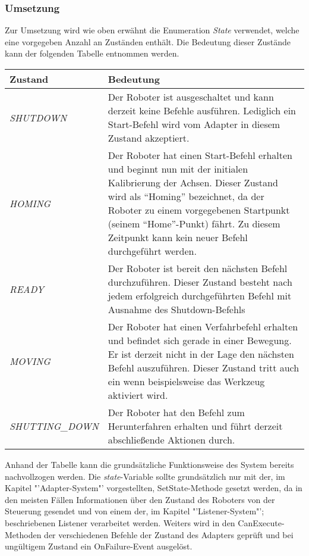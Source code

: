 \subsubsection{Umsetzung}
Zur Umsetzung wird wie oben erwähnt die Enumeration \textit{State} verwendet, welche eine vorgegeben Anzahl an Zuständen enthält. Die Bedeutung dieser Zustände kann der folgenden Tabelle entnommen werden.
\newline
\begin{tabular}{|p{4cm}|p{10cm}|}
\hline \rowcolor{lightgray}
\textbf{Zustand} & \textbf{Bedeutung}\\
\hline
\textit{SHUTDOWN} & Der Roboter ist ausgeschaltet und kann derzeit keine Befehle ausführen. Lediglich ein Start-Befehl wird vom Adapter in diesem Zustand akzeptiert.\\
\hline
\textit{HOMING} & Der Roboter hat einen Start-Befehl erhalten und beginnt nun mit der initialen Kalibrierung der Achsen. Dieser Zustand wird als “Homing” bezeichnet, da der Roboter zu einem vorgegebenen Startpunkt (seinem “Home”-Punkt) fährt. Zu diesem Zeitpunkt kann kein neuer Befehl durchgeführt werden.\\
\hline
\textit{READY} & Der Roboter ist bereit den nächsten Befehl durchzuführen. Dieser Zustand besteht nach jedem erfolgreich durchgeführten Befehl mit Ausnahme des Shutdown-Befehls \\
\hline
\textit{MOVING} & Der Roboter hat einen Verfahrbefehl erhalten und befindet sich gerade in einer Bewegung. Er ist derzeit nicht in der Lage den nächsten Befehl auszuführen. Dieser Zustand tritt auch ein wenn beispielsweise das Werkzeug aktiviert wird.\\
\hline
\textit{SHUTTING\_DOWN} & Der Roboter hat den Befehl zum Herunterfahren erhalten und führt derzeit abschließende Aktionen durch.\\ 
\hline
\end{tabular}
\newline
\newline
Anhand der Tabelle kann die grundsätzliche Funktionsweise des System bereits nachvollzogen werden. Die \textit{state}-Variable sollte grundsätzlich nur mit der, im Kapitel "'Adapter-System"' vorgestellten, SetState-Methode gesetzt werden, da in den meisten Fällen Informationen über den Zustand des Roboters von der Steuerung gesendet und von einem der, im Kapitel "'Listener-System"'; beschriebenen Listener verarbeitet werden. Weiters wird in den CanExecute-Methoden der verschiedenen Befehle der Zustand des Adapters geprüft und bei ungültigem Zustand ein OnFailure-Event ausgelöst.
